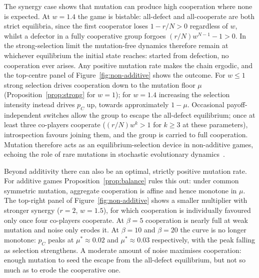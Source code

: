 \documentclass[11pt]{article}
\begin{document}
The synergy case shows that mutation can produce high cooperation where none
is expected. At \(w=1.4\) the game is bistable: all-defect and all-cooperate
are both strict equilibria, since the first cooperator loses
\(1-r/N>0\) regardless of \(w\), whilst a defector in a fully
cooperative group forgoes \((r/N)w^{N-1}-1>0\). In the
strong-selection limit the mutation-free dynamics therefore remain at
whichever equilibrium the initial state reaches: started from defection, no
cooperation ever arises. Any positive mutation rate makes the chain ergodic,
and the top-centre panel of Figure~\ref{fig:non-additive} shows the outcome.
For \(w\le1\) strong selection drives cooperation down to the mutation floor
\(\mu\) (Proposition~\ref{prop:strong} for \(w=1\)); for \(w=1.4\)
increasing the selection intensity instead drives \(p_C\) up, towards
approximately \(1-\mu\). Occasional payoff-independent switches allow the
group to escape the all-defect equilibrium; once at least three co-players
cooperate (\((r/N)w^{k}>1\) for \(k\ge3\) at these parameters),
introspection favours joining them, and the group is carried to full
cooperation. Mutation therefore acts as an equilibrium-selection device in
non-additive games, echoing the role of rare mutations in stochastic
evolutionary dynamics~\cite{fudenberg2006evolutionary}.

Beyond additivity there can also be an optimal, strictly positive mutation
rate. For additive games Proposition~\ref{prop:balance} rules this out:
under common symmetric mutation, aggregate cooperation is affine and hence
monotone in \(\mu\). The top-right panel of Figure~\ref{fig:non-additive}
shows a smaller multiplier with stronger synergy (\(r=2\), \(w=1.5\)), for
which cooperation is individually favoured only once four co-players
cooperate. At \(\beta=5\) cooperation is nearly full at weak mutation and
noise only erodes it. At \(\beta=10\) and \(\beta=20\) the curve is no
longer monotone: \(p_C\) peaks at \(\mu^*\approx0.02\) and
\(\mu^*\approx0.03\) respectively, with the peak falling as selection
strengthens. A moderate amount of noise maximises cooperation: enough
mutation to seed the escape from the all-defect equilibrium, but not so much
as to erode the cooperative one.
\end{document}
